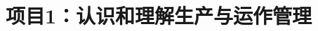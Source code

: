 \documentclass[11pt]{beamer}
\author{}
\title{项目1：认识和理解生产与运作管理}
\subtitle{}
\institute{东莞职业技术学院}
\date{}
\begin{document}
	\maketitle
	
	\begin{frame}
		\frametitle{}
	\end{frame}
\end{document}
